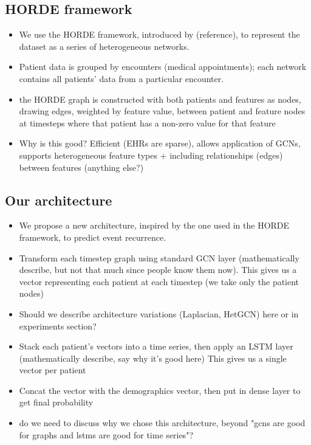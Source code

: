 \documentclass[conference]{IEEEtran}
\begin{document}
\subsection{HORDE framework}
\begin{itemize}
    \item We use the HORDE framework, introduced by (reference), to represent the dataset as a series of heterogeneous networks.
    \item Patient data is grouped by encounters (medical appointments); each network contains all patients' data from a particular encounter.
    \item the HORDE graph is constructed with both patients and features as nodes, drawing edges, weighted by feature value, 
            between patient and feature nodes at timesteps where that patient has a non-zero value for that feature
    \item Why is this good? Efficient (EHRs are sparse), allows application of GCNs, supports heterogeneous feature types + including relationships (edges) between features {\color{red} (anything else?)}
\end{itemize}

\subsection{Our architecture}
\begin{itemize}
    \item We propose a new architecture, inspired by the one used in the HORDE framework, to predict event recurrence.
    \item Transform each timestep graph using standard GCN layer (mathematically describe, but not that much since people know them now).
            This gives us a vector representing each patient at each timestep (we take only the patient nodes)
    \item {\color{red} Should we describe architecture variations (Laplacian, HetGCN) here or in experiments section?}
    \item Stack each patient's vectors into a time series, then apply an LSTM layer (mathematically describe, say why it's good here)
            This gives us a single vector per patient
    \item Concat the vector with the demographics vector, then put in dense layer to get final probability
    \item {\color{red} do we need to discuss why we chose this architecture, beyond "gcns are good for graphs and lstms are good for time series"?}
\end{itemize}
\end{document}
